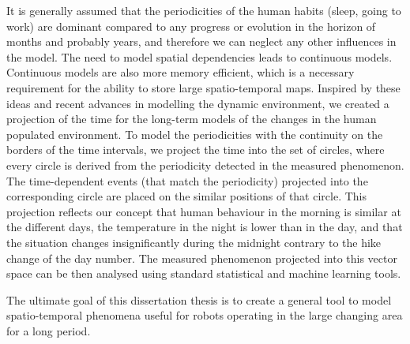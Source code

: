 It is generally assumed that the periodicities of the human habits (sleep, going to work) are dominant compared to any progress or evolution in the horizon of months and probably years, and therefore we can neglect any other influences in the model.
The need to model spatial dependencies leads to continuous models.
Continuous models are also more memory efficient, which is a necessary requirement for the ability to store large spatio-temporal maps. 
Inspired by these ideas and recent advances in modelling the dynamic environment, we created a projection of the time for the long-term models of the changes in the human populated environment.
To model the periodicities with the continuity on the borders of the time intervals, we project the time into the set of circles, where every circle is derived from the periodicity detected in the measured phenomenon.
The time-dependent events (that match the periodicity) projected into the corresponding circle are placed on the similar positions of that circle.
This projection reflects our concept that human behaviour in the morning is similar at the different days, the temperature in the night is lower than in the day, and that the situation changes insignificantly during the midnight contrary to the hike change of the day number.
The measured phenomenon projected into this vector space can be then analysed using standard statistical and machine learning tools.

The ultimate goal of this dissertation thesis is to create a general tool to model spatio-temporal phenomena useful for robots operating in the large changing area for a long period.
